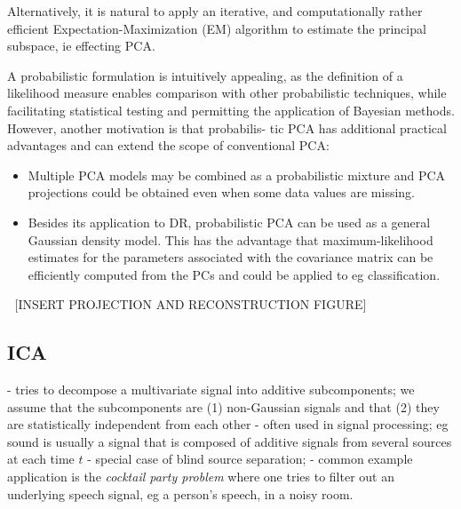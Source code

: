 \documentclass[journal, a4paper]{IEEEtran}
\begin{document}
Alternatively, it is natural to apply an iterative, and computationally rather efficient Expectation-Maximization (EM) algorithm to estimate the principal subspace, ie effecting PCA.


A probabilistic formulation is intuitively appealing, as the definition of a likelihood measure
enables comparison with other probabilistic techniques, while facilitating statistical testing and
permitting the application of Bayesian methods. However, another motivation is that probabilis-
tic PCA has additional practical advantages and can extend the scope of conventional PCA:
\begin{itemize}
	\item  Multiple PCA models may be combined as a probabilistic mixture and PCA projections could be obtained even when some data values are missing.
	\item Besides its application to DR, probabilistic PCA can be used as a general Gaussian density model. This has the advantage that maximum-likelihood estimates for the parameters associated with the covariance matrix can be efficiently computed from the PCs and could be applied to eg classification. 
\end{itemize}

[INSERT PROJECTION AND RECONSTRUCTION FIGURE]



\subsection{ICA}

- tries to decompose a multivariate signal into additive subcomponents;
we assume that the subcomponents are (1) non-Gaussian signals and that (2) they are statistically independent from each other
- often used in signal processing; eg sound is usually a signal that is composed of additive signals from several sources at each time \( t \)
- special case of blind source separation;
- common example application is the \textit{cocktail party problem} where one tries to filter out an underlying speech signal, eg a person's speech, in a noisy room. 

\end{document}
